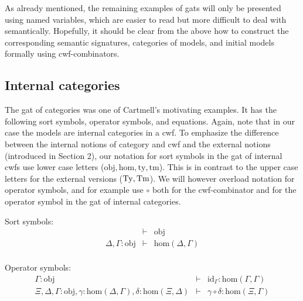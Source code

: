 \documentclass{lmcs}
\def\Obj{\mathrm{obj}}
\def\Hom{\mathrm{hom}}
\def\id{\mathrm{id}}
\newcommand{\ty}{\mathrm{ty}}
\newcommand{\tm}{\mathrm{tm}}
\begin{document}
As already mentioned, the remaining examples of gats will only be presented using named variables, which are easier to read but more difficult to deal with semantically. Hopefully, it should be clear from the above how to construct the corresponding semantic signatures, categories of models, and initial models formally using cwf-combinators.


\subsection{Internal categories} The gat of categories was one of Cartmell's motivating examples. It has the following sort symbols, operator symbols, and equations. Again, note that in our case the models are internal categories in a cwf. To emphasize the difference between the internal notions of category and cwf and the external notions (introduced in Section 2), our notation for sort symbols in the gat of internal cwfs use lower case letters ($\Obj, \Hom, \ty, \tm$). This is in contrast to the upper case letters for the external versions ($\mathrm{Ty}, \mathrm{Tm}$). We will however overload notation for operator symbols, and for example use $\circ$ both for the cwf-combinator and for the operator symbol in the gat of internal categories.

Sort symbols:
\begin{eqnarray*}
&\vdash& \Obj\\
\Delta, \Gamma : \Obj &\vdash& \Hom(\Delta,\Gamma)\\
\end{eqnarray*}

Operator symbols:
\begin{eqnarray*}
\Gamma : \Obj &\vdash& \id_\Gamma : \Hom(\Gamma,\Gamma)\\
\Xi,\Delta,\Gamma : \Obj, \gamma : \Hom(\Delta,\Gamma), \delta : \Hom(\Xi,\Delta) &\vdash&
\gamma \circ \delta : \Hom(\Xi,\Gamma)
\end{eqnarray*}
\end{document}
